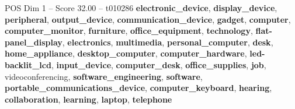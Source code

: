 \begin{textsample}{POS Dim 1 – Score 32.00 – t010286}  \label{ex:f1_pos_008}
\textbf{electronic\_device}, \textbf{display\_device}, \textbf{peripheral}, \textbf{output\_device}, \textbf{communication\_device}, \textbf{gadget}, \textbf{computer}, \textbf{computer\_monitor}, \textbf{furniture}, \textbf{office\_equipment}, \textbf{technology}, \textbf{flat-panel\_display}, \textbf{electronics}, \textbf{multimedia}, \textbf{personal\_computer}, \textbf{desk}, \textbf{home\_appliance}, \textbf{desktop\_computer}, \textbf{computer\_hardware}, \textbf{led-backlit\_lcd}, \textbf{input\_device}, \textbf{computer\_desk}, \textbf{office\_supplies}, \textbf{job}, videoconferencing, \textbf{software\_engineering}, \textbf{software}, \textbf{portable\_communications\_device}, \textbf{computer\_keyboard}, \textbf{hearing}, \textbf{collaboration}, \textbf{learning}, \textbf{laptop}, \textbf{telephone}

\end{textsample}
